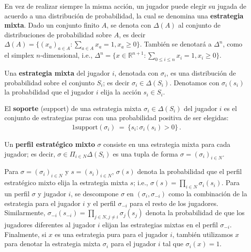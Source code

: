 En vez de realizar siempre la misma acción, un jugador puede elegir su jugada de acuerdo a una distribución de probabilidad, la cual se denomina una \textbf{estrategia mixta}. Dado un conjunto finito $A$, se denota con $\Delta(A)$ al conjunto de distribuciones de probabilidad sobre $A$, es decir $\Delta(A) = \{ (x_a)_{a \in A} : \sum_{a \in A} x_a = 1, x_a \geq 0\}$. También se denotará a $\Delta^n$, como el simplex $n$-dimensional, i.e., $\Delta^n = \{ x \in \mathbb{R}^{n+1} : \sum_{0 \leq i \leq n}x_i = 1, x_i \geq 0 \}$.

\begin{definition} Una \textbf{estrategia mixta} del jugador $i$, denotada con $\sigma_i$, es una distribución de probabilidad sobre el conjunto $S_i$; es decir $\sigma_i \in \Delta(S_i)$. Denotamos con $\sigma_i(s_i)$ la probabilidad que el jugador $i$ elija la acción $s_i \in S_i$. 
\end{definition}

\begin{definition}
El \textbf{soporte} (support) de una estrategia mixta $\sigma_i \in \Delta(S_i)$ del jugador $i$ es el conjunto de estrategias puras con una probabilidad positiva de ser elegidas:
\begin{alignat}{1}
\text{support}(\sigma_i)\ =\ \{s_i : \sigma_i(s_i) > 0 \} \,.
\end{alignat}
\end{definition}

\begin{definition}
Un \textbf{perfil estratégico mixto} $\sigma$ consiste en una estrategia mixta para cada jugador; es decir, $\sigma \in \Pi_{i \in N} \Delta(S_i)$ es una tupla de forma $\sigma=(\sigma_i)_{i \in N}$.
\end{definition}

Para $\sigma = (\sigma_i)_{i \in N}$ y $s = (s_i)_{i \in N}$, $\sigma(s)$ denota la probabilidad que el perfil estratégico mixto elija la estrategia mixta $s$; i.e., $\sigma(s)=\prod_{i\in N} \sigma_i(s_i)$. Para un perfil $\sigma$ y jugador $i$, se descompone $\sigma$ en $(\sigma_i,\sigma_{-i})$ como la combinación de la estrategia para el jugador $i$ y el perfil $\sigma_{-i}$ para el resto de los jugadores. Similarmente, $\sigma_{-i}(s_{-i})=\prod_{j\in N,j\neq i}\sigma_j(s_j)$ denota la probabilidad de que los jugadores diferentes al jugador $i$ elijan las estrategias mixtas en el perfil $\sigma_{-i}$. Finalmente, si $x$ es una estrategia pura para el jugador $i$, también utilizamos $x$ para denotar la estrategia mixta $\sigma_i$ para el jugador $i$ tal que $\sigma_i(x)=1$.

